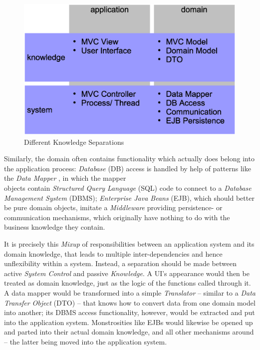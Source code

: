 \begin{figure}[ht]
    \begin{center}
        \includegraphics[scale=0.2]{vector/separation.eps}
        \caption{Different Knowledge Separations}
        \label{separation_figure}
    \end{center}
\end{figure}

Similarly, the domain often contains functionality which actually does belong
into the application process: \emph{Database} (DB) access is handled by help of
patterns like the \emph{Data Mapper} \cite{heller2005}, in which the mapper\\
objects contain \emph{Structured Query Language} (SQL) code to connect to a
\emph{Database Management System} (DBMS); \emph{Enterprise Java Beans} (EJB),
which should better be pure domain objects, imitate a \emph{Middleware}
providing persistence- or communication mechanisms, which originally have
nothing to do with the business knowledge they contain.

It is precisely this \emph{Mixup} of responsibilities between an application
system and its domain knowledge, that leads to multiple inter-dependencies and
hence unflexibility within a system. Instead, a separation should be made
between active \emph{System Control} and passive \emph{Knowledge}. A UI's
appearance would then be treated as domain knowledge, just as the logic of the
functions called through it. A data mapper would be transformed into a simple
\emph{Translator} -- similar to a \emph{Data Transfer Object} (DTO)
\cite{heller2005} -- that knows how to convert data from one domain model into
another; its DBMS access functionality, however, would be extracted and put
into the application system. Monstrosities like EJBs would likewise be opened
up and parted into their actual domain knowledge, and all other mechanisms
around -- the latter being moved into the application system.

